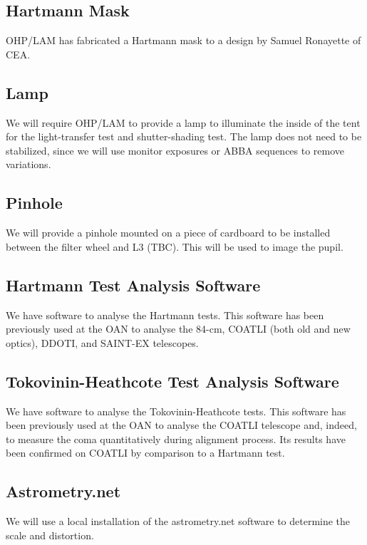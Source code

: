 \documentclass{article}
\begin{document}
\subsection{Hartmann Mask}

OHP/LAM has fabricated a Hartmann mask to a design by Samuel Ronayette of CEA.

\subsection{Lamp}

We will require OHP/LAM to provide a lamp to illuminate the inside of the tent for the light-transfer test and shutter-shading test. The lamp does not need to be stabilized, since we will use monitor exposures or ABBA sequences to remove variations.

\subsection{Pinhole}

We will provide a pinhole mounted on a piece of cardboard to be installed between the filter wheel and L3 (TBC). This will be used to image the pupil.

\subsection{Hartmann Test Analysis Software}

We have software to analyse the Hartmann tests. This software has been previously used at the OAN to analyse the 84-cm, COATLI (both old and new optics), DDOTI, and SAINT-EX telescopes.

\subsection{Tokovinin-Heathcote Test Analysis Software}

We have software to analyse the Tokovinin-Heathcote tests. This software has been previously used at the OAN to analyse the COATLI telescope and, indeed, to measure the coma quantitatively during alignment process. Its results have been confirmed on COATLI by comparison to a Hartmann test.

\subsection{Astrometry.net}

We will use a local installation of the astrometry.net software to determine the scale and distortion.
\end{document}
